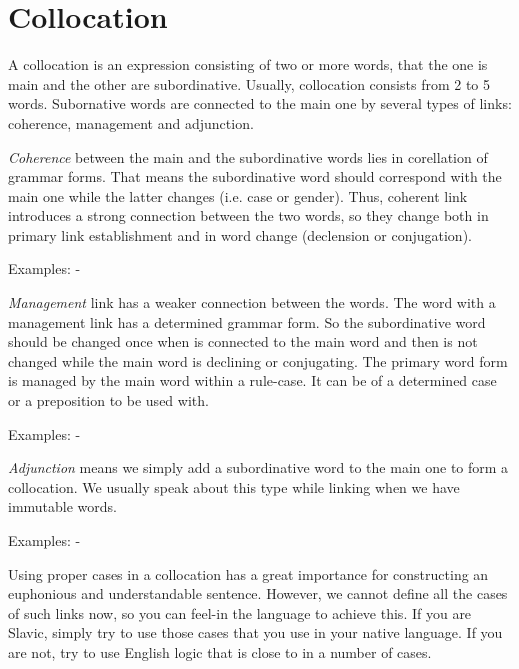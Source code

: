 \section{Collocation}

A collocation is an expression consisting of two or more words, that the one is main and the other are subordinative. Usually, collocation consists from 2 to 5 words. Subornative words are connected to the main one by several types of links: coherence, management and adjunction.

\textit{Coherence} between the main and the subordinative words lies in corellation of grammar forms. That means the subordinative word should correspond with the main one while the latter changes (i.e. case or gender). Thus, coherent link introduces a strong connection between the two words, so they change both in primary link establishment and in word change (declension or conjugation).

Examples:
- 

\textit{Management} link has a weaker connection between the words. The word with a management link has a determined grammar form. So the subordinative word should be changed once when is connected to the main word and then is not changed while the main word is declining or conjugating. The primary word form is managed by the main word within a rule-case. It can be of a determined case or a preposition to be used with.

Examples:
- 

\textit{Adjunction} means we simply add a subordinative word to the main one to form a collocation. We usually speak about this type while linking when we have immutable words.

Examples:
- 

Using proper cases in a collocation has a great importance for constructing an euphonious and understandable sentence. However, we cannot define all the cases of such links now, so you can feel-in the language to achieve this. If you are Slavic, simply try to use those cases that you use in your native language. If you are not, try to use English logic that is close to in a number of cases.